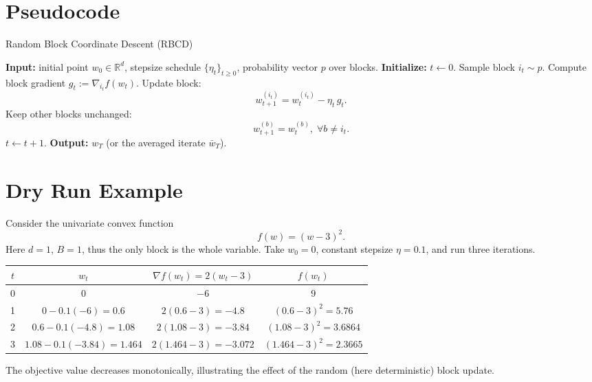 \documentclass[11pt]{article}
\newcommand{\R}{\mathbb{R}}
\begin{document}
\section*{Pseudocode}
\begin{algorithm}[H]
\caption{Random Block Coordinate Descent (RBCD)}
\begin{algorithmic}[1]
\State \textbf{Input:} initial point $w_0\in\R^d$, stepsize schedule $\{\eta_t\}_{t\ge 0}$,
probability vector $p$ over blocks.
\State \textbf{Initialize:} $t\gets 0$.
    \State Sample block $i_t\sim p$.
    \State Compute block gradient $g_t:=\nabla_{i_t}f(w_t)$.
    \State Update block:
    \[
    w^{(i_t)}_{t+1}= w^{(i_t)}_{t}-\eta_t\,g_t .
    \]
    \State Keep other blocks unchanged:
    \[
    w^{(b)}_{t+1}=w^{(b)}_{t},\;\forall b\neq i_t .
    \]
    \State $t\gets t+1$.
\EndWhile
\State \textbf{Output:} $w_T$ (or the averaged iterate $\bar w_T$).
\end{algorithmic}
\end{algorithm}

\section*{Dry Run Example}
Consider the univariate convex function 
\[
f(w)=(w-3)^2 .
\]
Here $d=1$, $B=1$, thus the only block is the whole variable.
Take $w_0=0$, constant stepsize $\eta=0.1$, and run three iterations.

\begin{center}
\begin{tabular}{c|c|c|c}
$t$ & $w_t$ & $\nabla f(w_t)=2(w_t-3)$ & $f(w_t)$\\ \hline
0 & $0$ & $-6$ & $9$\\
1 & $0-0.1(-6)=0.6$ & $2(0.6-3)=-4.8$ & $(0.6-3)^2=5.76$\\
2 & $0.6-0.1(-4.8)=1.08$ & $2(1.08-3)=-3.84$ & $(1.08-3)^2=3.6864$\\
3 & $1.08-0.1(-3.84)=1.464$ & $2(1.464-3)=-3.072$ & $(1.464-3)^2=2.3665$
\end{tabular}
\end{center}
The objective value decreases monotonically, illustrating the effect of the
random (here deterministic) block update.

\end{document}
